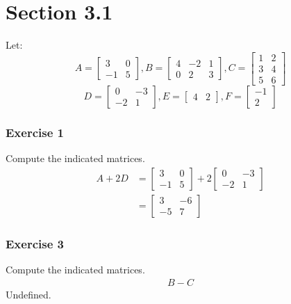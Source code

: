 \documentclass{math}
\begin{document}
\section*{Section 3.1}
Let:
\[ A = \begin{bmatrix}3 & 0 \\ -1 & 5\end{bmatrix},
  B = \begin{bmatrix}4 & -2 & 1 \\ 0 & 2 & 3\end{bmatrix},
  C = \begin{bmatrix}1 & 2 \\ 3 & 4 \\ 5 & 6\end{bmatrix} \]
\[ D = \begin{bmatrix}0 & -3 \\ -2 & 1\end{bmatrix},
  E = \begin{bmatrix}4 & 2\end{bmatrix},
  F = \begin{bmatrix}-1 \\ 2\end{bmatrix} \]

\subsubsection*{Exercise 1}
Compute the indicated matrices.
\begin{align*}
  A+2D &= \begin{bmatrix}
    3 & 0 \\
    -1 & 5
  \end{bmatrix}+2\begin{bmatrix}
    0 & -3 \\
    -2 & 1
  \end{bmatrix} \\
  &= \begin{bmatrix}
    3 & -6 \\
    -5 & 7
  \end{bmatrix}
\end{align*}

\subsubsection*{Exercise 3}
Compute the indicated matrices.
\begin{align*}
  B-C
\end{align*}
Undefined.
\end{document}
